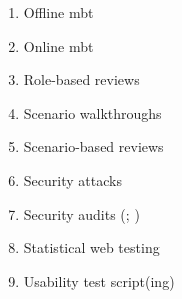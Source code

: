 \begin{enumerate}
    \item Offline \acf{mbt} \citepISTQB{}
    \item Online \acs{mbt} \citepISTQB{}
    \item Role-based reviews \citepISTQB{}
    \item Scenario walkthroughs \citep[Fig.~4]{Gerrard2000a}
    \item Scenario-based reviews \citepISTQB{}
    \item Security attacks \citepISTQB{}
    \item Security audits (\citealp[p.~40]{IEEE2021c}; \citealp[p.~28]{Gerrard2000b})
    \item Statistical web testing \citep[p.~185]{DoğanEtAl2014}
    \item Usability test script(ing) \citepISTQB{}

\end{enumerate}
